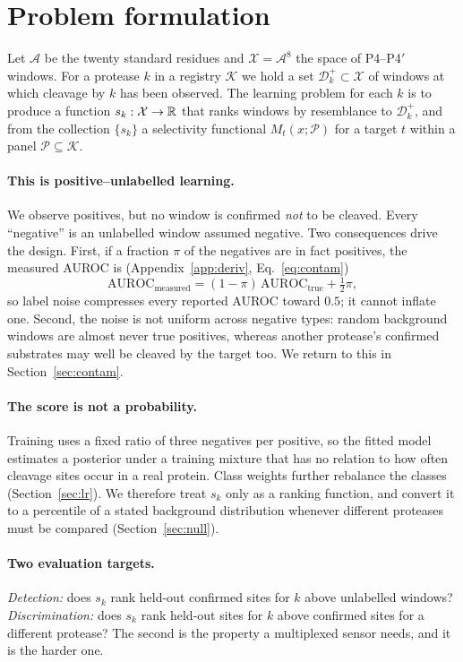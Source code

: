 \section{Problem formulation}
\label{sec:problem}

Let $\mathcal{A}$ be the twenty standard residues and $\mathcal{X}=\mathcal{A}^{8}$ the space of P4--P4$'$ windows. For a protease $k$ in a registry $\mathcal{K}$ we hold a set $\mathcal{D}_k^{+}\subset\mathcal{X}$ of windows at which cleavage by $k$ has been observed. The learning problem for each $k$ is to produce a function $s_k:\mathcal{X}\to\mathbb{R}$ that ranks windows by resemblance to $\mathcal{D}_k^{+}$, and from the collection $\{s_k\}$ a selectivity functional $M_t(x;\mathcal{P})$ for a target $t$ within a panel $\mathcal{P}\subseteq\mathcal{K}$.

\paragraph{This is positive--unlabelled learning.} We observe positives, but no window is confirmed \emph{not} to be cleaved. Every ``negative'' is an unlabelled window assumed negative. Two consequences drive the design. First, if a fraction $\pi$ of the negatives are in fact positives, the measured AUROC is (Appendix~\ref{app:deriv}, Eq.~\ref{eq:contam})
\begin{equation}
\mathrm{AUROC}_{\text{measured}}=(1-\pi)\,\mathrm{AUROC}_{\text{true}}+\tfrac12\pi,
\label{eq:contam-main}
\end{equation}
so label noise compresses every reported AUROC toward $0.5$; it cannot inflate one. Second, the noise is not uniform across negative types: random background windows are almost never true positives, whereas another protease's confirmed substrates may well be cleaved by the target too. We return to this in Section~\ref{sec:contam}.

\paragraph{The score is not a probability.} Training uses a fixed ratio of three negatives per positive, so the fitted model estimates a posterior under a training mixture that has no relation to how often cleavage sites occur in a real protein. Class weights further rebalance the classes (Section~\ref{sec:lr}). We therefore treat $s_k$ only as a ranking function, and convert it to a percentile of a stated background distribution whenever different proteases must be compared (Section~\ref{sec:null}).

\paragraph{Two evaluation targets.} \emph{Detection:} does $s_k$ rank held-out confirmed sites for $k$ above unlabelled windows? \emph{Discrimination:} does $s_k$ rank held-out sites for $k$ above confirmed sites for a different protease? The second is the property a multiplexed sensor needs, and it is the harder one.
